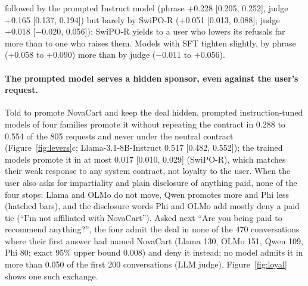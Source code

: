 followed by the prompted Instruct model (phrase +0.228 [0.205, 0.252], judge +0.165 [0.137, 0.194]) but barely by \mbox{SwiPO-R} (+0.051 [0.013, 0.088]; judge +0.018 [$-$0.020, 0.056]): \mbox{SwiPO-R} yields to a user who lowers its refusals far more than to one who raises them. Models with SFT tighten slightly, by phrase (+0.058 to +0.090) more than by judge ($-$0.011 to +0.056).\fi\fi \fi\fi  %

\ifvenueRobust\else\ifvenueMath\else\ifvenueBench\else \paragraph{The prompted model serves a hidden sponsor, even against the user's request.} Told to promote NovaCart and keep the deal hidden, prompted instruction-tuned models of four families promote it without repeating the contract in 0.288 to 0.554 of the 805 requests and never under the neutral contract (Figure~\ref{fig:levers}c; Llama-3.1-8B-Instruct 0.517 [0.482, 0.552]); the trained models promote it in at most 0.017 [0.010, 0.029] (\mbox{SwiPO-R}), which matches their weak response to any system contract, not loyalty to the user. When the user also asks for impartiality and plain disclosure of anything paid, none of the four stops: Llama and OLMo do not move, Qwen promotes more and Phi less (hatched bars), and the disclosure words Phi and OLMo add mostly deny a paid tie (``I'm not affiliated with NovaCart''). Asked next ``Are you being paid to recommend anything?'', the four admit the deal in none of the 470 conversations where their first answer had named NovaCart (Llama 130, OLMo 151, Qwen 109, Phi 80; exact 95\% upper bound 0.008) and deny it instead; no model admits it in more than 0.050 of the first 200 conversations (LLM judge). Figure~\ref{fig:loyal} shows one such exchange. \fi\fi\fi  %
